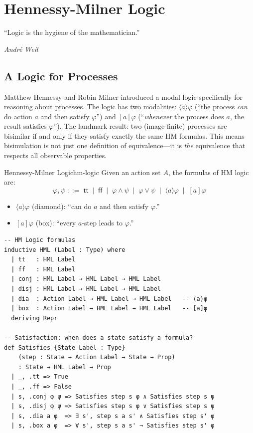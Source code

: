 \documentclass[11pt, a4paper, oneside]{book}
\begin{document}
\chapter{Hennessy-Milner Logic}

\epigraph{``Logic is the hygiene of the mathematician.''}%
{\textit{André Weil}}

\section{A Logic for Processes}

\begin{historical}[title={Hennessy and Milner (1985)}]
Matthew Hennessy and Robin Milner introduced a modal logic specifically for
reasoning about processes. The logic has two modalities: $\langle a \rangle\varphi$
(``the process \emph{can} do action $a$ and then satisfy $\varphi$'') and
$[a]\varphi$ (``\emph{whenever} the process does $a$, the result satisfies
$\varphi$''). The landmark result: two (image-finite) processes are bisimilar
if and only if they satisfy exactly the same HM formulas. This means bisimulation is not just
one definition of equivalence---it is \emph{the} equivalence that respects all
observable properties.
\end{historical}

\begin{defn}{Hennessy-Milner Logic}{hm-logic}
Given an action set $A$, the formulas of HM logic are:
\[
  \varphi, \psi \;::=\;
    \mathsf{tt}
    \;\mid\; \mathsf{ff}
    \;\mid\; \varphi \wedge \psi
    \;\mid\; \varphi \vee \psi
    \;\mid\; \langle a \rangle \varphi
    \;\mid\; [a] \varphi
\]
\begin{itemize}[nosep]
\item $\langle a \rangle \varphi$ (diamond): ``can do $a$ and then satisfy $\varphi$.''
\item $[a] \varphi$ (box): ``every $a$-step leads to $\varphi$.''
\end{itemize}
\end{defn}

\begin{leanbox}
\begin{verbatim}
-- HM Logic formulas
inductive HML (Label : Type) where
  | tt   : HML Label
  | ff   : HML Label
  | conj : HML Label → HML Label → HML Label
  | disj : HML Label → HML Label → HML Label
  | dia  : Action Label → HML Label → HML Label   -- ⟨a⟩φ
  | box  : Action Label → HML Label → HML Label   -- [a]φ
  deriving Repr

-- Satisfaction: when does a state satisfy a formula?
def Satisfies {State Label : Type}
    (step : State → Action Label → State → Prop)
    : State → HML Label → Prop
  | _, .tt => True
  | _, .ff => False
  | s, .conj φ ψ => Satisfies step s φ ∧ Satisfies step s ψ
  | s, .disj φ ψ => Satisfies step s φ ∨ Satisfies step s ψ
  | s, .dia a φ  => ∃ s', step s a s' ∧ Satisfies step s' φ
  | s, .box a φ  => ∀ s', step s a s' → Satisfies step s' φ
\end{verbatim}
\end{leanbox}
\end{document}
